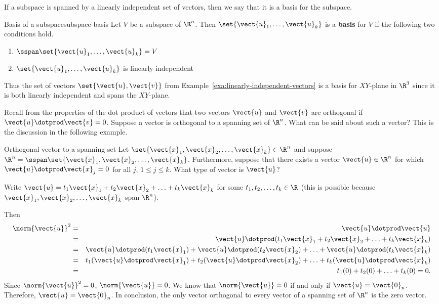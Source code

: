 If a subspace is spanned by a linearly independent set of vectors,
then we say that it is a basis for the subspace.

\begin{definition}{Basis of a subspace}{subspace-basis}
Let $V$ be a subspace of $\R^{n}$. Then $\set{
\vect{u}_{1},\ldots,\vect{u}_{k}} $ is a \textbf{basis} for
$V$ if the following two conditions
hold.

\begin{enumerate}
\item $\sspan\set{\vect{u}_{1},\ldots,\vect{u}_{k}} =V$
\item $\set{\vect{u}_{1},\ldots,\vect{u}_{k}} $ is linearly
independent
\end{enumerate}
\end{definition}

Thus the set of vectors $\set{\vect{u}, \vect{v}}$ from Example~\ref{exa:linearly-independent-vectors} is a basis for $XY$-plane in
$\R^{3}$ since it is both linearly independent and spans
the $XY$-plane.

 Recall from the properties of the dot product of vectors 
that two vectors $\vect{u}$ and $\vect{v}$ are orthogonal if $\vect{u}
\dotprod \vect{v} = 0$. Suppose a vector is orthogonal to a spanning set of $\R^n$. What can be said about such a vector? This is the discussion in the following example.

\begin{example}{Orthogonal vector to a spanning set}{}
Let $\set{\vect{x}_1, \vect{x}_2, \ldots, \vect{x}_k}\in\R^n$ and
suppose $\R^n=\sspan\set{\vect{x}_1, \vect{x}_2, \ldots, \vect{x}_k}$.
Furthermore, suppose that there exists a vector $\vect{u}\in\R^n$ for which $\vect{u}\dotprod \vect{x}_j=0$ for all $j$, $1\leq j\leq k$.
What type of vector is $\vect{u}$?
\end{example}

\begin{solution}
Write $\vect{u}=t_1\vect{x}_1 + t_2\vect{x}_2 +\ldots +t_k\vect{x}_k$
for some $t_1, t_2, \ldots, t_k\in\R$
(this is possible because
$\vect{x}_1, \vect{x}_2, \ldots, \vect{x}_k$ span $\R^n$).
 
Then
\begin{eqnarray*}
\norm{\vect{u}}^2 & = & \vect{u}\dotprod\vect{u} \\
& = & \vect{u}\dotprod(t_1\vect{x}_1 + t_2\vect{x}_2 +\ldots +t_k\vect{x}_k) \\
& = & \vect{u}\dotprod (t_1\vect{x}_1) +  \vect{u}\dotprod (t_2\vect{x}_2) +
\ldots +  \vect{u}\dotprod (t_k\vect{x}_k) \\
& = & t_1(\vect{u}\dotprod \vect{x}_1) + t_2(\vect{u}\dotprod \vect{x}_2) + \ldots 
+ t_k(\vect{u}\dotprod \vect{x}_k) \\
& = & t_1(0) + t_2(0) + \ldots + t_k(0) = 0.
\end{eqnarray*}
Since $\norm{\vect{u}}^2 =0$, $\norm{\vect{u}} =0$.
We know that $\norm{\vect{u}}=0$ if and only if 
$\vect{u}=\vect{0}_n$.
Therefore, $\vect{u}=\vect{0}_n$.
In conclusion, the only vector orthogonal to every vector of
a spanning set of $\R^n$ is the zero vector.
\end{solution}

